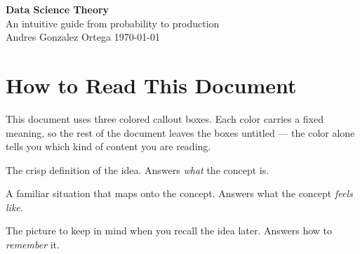\documentclass[12pt,a4paper]{article}
\begin{document}

\thispagestyle{empty}
\vspace*{2cm}
\begin{flushleft}
  {\Huge\bfseries\color{inkdark} Data Science Theory}\\[10pt]
  {\large\color{inkmid} An intuitive guide from probability to production}\\[20pt]
  {\small\color{inkmid} Andres Gonzalez Ortega
    \quad\textbullet\quad \today}
\end{flushleft}
\vspace{1.5cm}

\tableofcontents
\newpage

\section*{How to Read This Document}

This document uses three colored callout boxes. Each color carries a fixed
meaning, so the rest of the document leaves the boxes untitled --- the color
alone tells you which kind of content you are reading.

\begin{concept}
The crisp definition of the idea. Answers \emph{what} the concept is.
\end{concept}

\begin{analogy}
A familiar situation that maps onto the concept. Answers what the concept
\emph{feels like}.
\end{analogy}

\begin{mentalmodel}
The picture to keep in mind when you recall the idea later. Answers how to
\emph{remember} it.
\end{mentalmodel}
\end{document}
